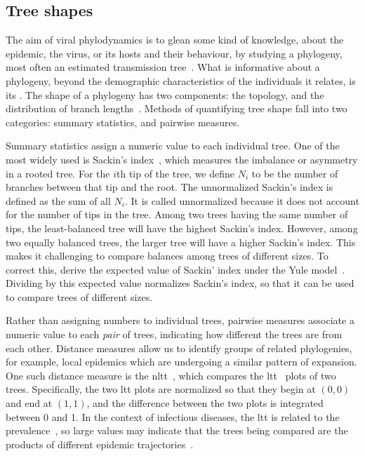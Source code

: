 \subsection{Tree shapes}
\label{subsec:treeshape}

The aim of viral phylodynamics is to glean some kind of knowledge, about the
epidemic, the virus, or its hosts and their behaviour, by studying a phylogeny,
most often an estimated transmission tree~\autocite{pybus2009evolutionary,
volz2013viral}. What is informative about a phylogeny, beyond the demographic
characteristics of the individuals it relates, is its . The shape
of a phylogeny has two components: the topology, and the distribution of branch
lengths~\autocite{mooers1997inferring}. Methods of quantifying tree shape fall
into two categories: summary statistics, and pairwise measures.

Summary statistics assign a numeric value to each individual tree. One of the
most widely used is Sackin's index~\autocite{shao1990tree}, which measures the
imbalance or asymmetry in a rooted tree. For the $i$th tip of the tree, we
define $N_i$ to be the number of branches between that tip and the root. The
unnormalized Sackin's index is defined as the sum of all $N_i$. It is called
unnormalized because it does not account for the number of tips in the tree.
Among two trees having the same number of tips, the least-balanced tree will
have the highest Sackin's index. However, among two equally balanced trees, the
larger tree will have a higher Sackin's index. This makes it challenging to
compare balances among trees of different sizes. To correct this,
\textcite{kirkpatrick1993searching} derive the expected value of Sackin' index
under the Yule model~\autocite{yule1925mathematical}. Dividing by this expected
value normalizes Sackin's index, so that it can be used to compare trees of
different sizes.

Rather than assigning numbers to individual trees, pairwise measures associate
a numeric value to each \textit{pair} of trees, indicating how different the
trees are from each other. Distance measures allow us to identify groups of
related phylogenies, for example, local epidemics which are undergoing a
similar pattern of expansion. One such distance measure is the
\gls{nltt}~\autocite{janzen2015approximate}, which compares the
\gls{ltt}~\autocite{nee1992tempo} plots of two trees. Specifically, the two
\gls{ltt} plots are normalized so that they begin at $(0, 0)$ and end at $(1,
1)$, and the difference between the two plots is integrated between 0 and 1. In
the context of infectious diseases, the \gls{ltt} is related to the
prevalence~\autocite{holmes1995revealing}, so large values may indicate that
the trees being compared are the products of different epidemic
trajectories~\autocite{janzen2015approximate}.

